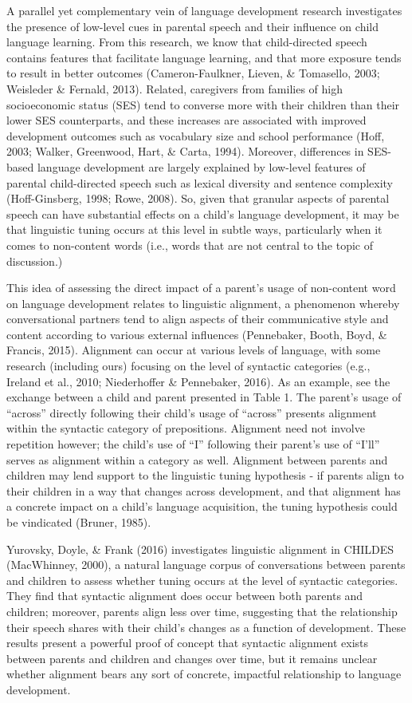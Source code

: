 \documentclass[10pt, letterpaper]{article}
\begin{document}
A parallel yet complementary vein of language development research
investigates the presence of low-level cues in parental speech and their
influence on child language learning. From this research, we know that
child-directed speech contains features that facilitate language
learning, and that more exposure tends to result in better outcomes
(Cameron-Faulkner, Lieven, \& Tomasello, 2003; Weisleder \& Fernald,
2013). Related, caregivers from families of high socioeconomic status
(SES) tend to converse more with their children than their lower SES
counterparts, and these increases are associated with improved
development outcomes such as vocabulary size and school performance
(Hoff, 2003; Walker, Greenwood, Hart, \& Carta, 1994). Moreover,
differences in SES-based language development are largely explained by
low-level features of parental child-directed speech such as lexical
diversity and sentence complexity (Hoff-Ginsberg, 1998; Rowe, 2008). So,
given that granular aspects of parental speech can have substantial
effects on a child's language development, it may be that linguistic
tuning occurs at this level in subtle ways, particularly when it comes
to non-content words (i.e., words that are not central to the topic of
discussion.)

This idea of assessing the direct impact of a parent's usage of
non-content word on language development relates to linguistic
alignment, a phenomenon whereby conversational partners tend to align
aspects of their communicative style and content according to various
external influences (Pennebaker, Booth, Boyd, \& Francis, 2015).
Alignment can occur at various levels of language, with some research
(including ours) focusing on the level of syntactic categories (e.g.,
Ireland et al., 2010; Niederhoffer \& Pennebaker, 2016). As an example,
see the exchange between a child and parent presented in Table 1. The
parent's usage of ``across'' directly following their child's usage of
``across'' presents alignment within the syntactic category of
prepositions. Alignment need not involve repetition however; the child's
use of ``I'' following their parent's use of ``I'll'' serves as
alignment within a category as well. Alignment between parents and
children may lend support to the linguistic tuning hypothesis - if
parents align to their children in a way that changes across
development, and that alignment has a concrete impact on a child's
language acquisition, the tuning hypothesis could be vindicated (Bruner,
1985).

Yurovsky, Doyle, \& Frank (2016) investigates linguistic alignment in
CHILDES (MacWhinney, 2000), a natural language corpus of conversations
between parents and children to assess whether tuning occurs at the
level of syntactic categories. They find that syntactic alignment does
occur between both parents and children; moreover, parents align less
over time, suggesting that the relationship their speech shares with
their child's changes as a function of development. These results
present a powerful proof of concept that syntactic alignment exists
between parents and children and changes over time, but it remains
unclear whether alignment bears any sort of concrete, impactful
relationship to language development.
\end{document}

